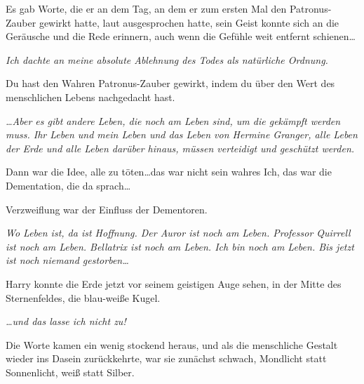 Es gab Worte, die er an dem Tag, an dem er zum ersten Mal den Patronus-Zauber gewirkt hatte, laut ausgesprochen hatte, sein Geist konnte sich an die Geräusche und die Rede erinnern, auch wenn die Gefühle weit entfernt schienen…

\emph{Ich dachte an meine absolute Ablehnung des Todes als natürliche Ordnung.}

Du hast den Wahren Patronus-Zauber gewirkt, indem du über den Wert des menschlichen Lebens nachgedacht hast.

\emph{…Aber es gibt andere Leben, die noch am Leben sind, um die gekämpft werden muss. Ihr Leben und mein Leben und das Leben von Hermine Granger, alle Leben der Erde und alle Leben darüber hinaus, müssen verteidigt und geschützt werden.}

Dann war die Idee, alle zu töten…das war nicht sein wahres Ich, das war die Dementation, die da sprach…

Verzweiflung war der Einfluss der Dementoren.

\emph{Wo Leben ist, da ist Hoffnung. Der Auror ist noch am Leben. Professor Quirrell ist noch am Leben. Bellatrix ist noch am Leben. Ich bin noch am Leben. Bis jetzt ist noch niemand gestorben…}

Harry konnte die Erde jetzt vor seinem geistigen Auge sehen, in der Mitte des Sternenfeldes, die blau-weiße Kugel.

\emph{…und das lasse ich nicht zu!}


Die Worte kamen ein wenig stockend heraus, und als die menschliche Gestalt wieder ins Dasein zurückkehrte, war sie zunächst schwach, Mondlicht statt Sonnenlicht, weiß statt Silber.

